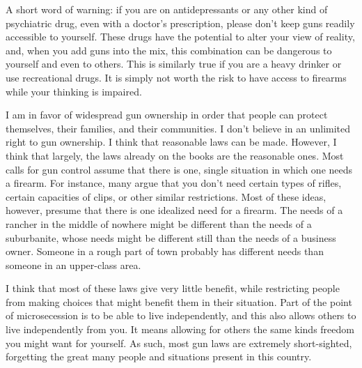 A short word of warning: if you are on antidepressants or any other kind
of psychiatric drug, even with a doctor’s prescription, please don’t
keep guns readily accessible to yourself. These drugs have the
potential to alter your view of reality, and, when you add guns into
the mix, this combination can be dangerous to yourself and even to
others. This is similarly true if you are a heavy drinker or use
recreational drugs. It is simply not worth the risk to have access to
firearms while your thinking is impaired.

\begin{policynote}
I am in favor of widespread gun ownership in order that people can
protect themselves, their families, and their communities. I don’t
believe in an unlimited right to gun ownership. I think that reasonable
laws can be made. However, I think that largely, the laws already on
the books are the reasonable ones. Most calls for gun control assume
that there is one, single situation in which one needs a firearm. For
instance, many argue that you don’t need certain types of rifles,
certain capacities of clips, or other similar restrictions. Most of
these ideas, however, presume that there is one idealized need for a
firearm. The needs of a rancher in the middle of nowhere might be
different than the needs of a suburbanite, whose needs might be
different still than the needs of a business owner. Someone in a rough
part of town probably has different needs than someone in an
upper-class area.

I think that most of these laws give very little benefit, while
restricting people from making choices that might benefit them in their
situation. Part of the point of microsecession is to be able to live
independently, and this also allows others to live independently from
you. It means allowing for others the same kinds freedom you might want
for yourself. As such, most gun laws are extremely short-sighted,
forgetting the great many people and situations present in this
country.
\end{policynote}

